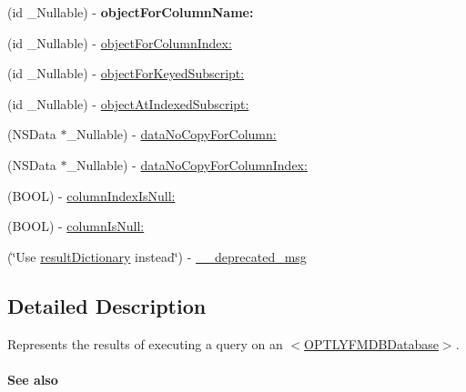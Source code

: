 \begin{DoxyCompactItemize}
\mbox{\label{interface_o_p_t_l_y_f_m_d_b_result_set_a8a54e6edfb9c3a4279a10651121c5daa}} 
(id \+\_\+\+Nullable) -\/ {\bfseries object\+For\+Column\+Name\+:}
\item 
(id \+\_\+\+Nullable) -\/ \mbox{\hyperlink{interface_o_p_t_l_y_f_m_d_b_result_set_a8ab70c23da0b55086576b3cecfdef898}{object\+For\+Column\+Index\+:}}
\item 
(id \+\_\+\+Nullable) -\/ \mbox{\hyperlink{interface_o_p_t_l_y_f_m_d_b_result_set_ae62a2c515a8cfe62a26bc5d340f91f72}{object\+For\+Keyed\+Subscript\+:}}
\item 
(id \+\_\+\+Nullable) -\/ \mbox{\hyperlink{interface_o_p_t_l_y_f_m_d_b_result_set_a497f36dbe6e774a9951b329d4bb7f4b1}{object\+At\+Indexed\+Subscript\+:}}
\item 
(N\+S\+Data $\ast$\+\_\+\+Nullable) -\/ \mbox{\hyperlink{interface_o_p_t_l_y_f_m_d_b_result_set_a4408546aea90f5eaf2044315b286edc6}{data\+No\+Copy\+For\+Column\+:}}
\item 
(N\+S\+Data $\ast$\+\_\+\+Nullable) -\/ \mbox{\hyperlink{interface_o_p_t_l_y_f_m_d_b_result_set_aa044fe54559ae3068230851fb0f7c7b1}{data\+No\+Copy\+For\+Column\+Index\+:}}
\item 
(B\+O\+OL) -\/ \mbox{\hyperlink{interface_o_p_t_l_y_f_m_d_b_result_set_abd2a9b52acb48553a5a57f21a4e23b8d}{column\+Index\+Is\+Null\+:}}
\item 
(B\+O\+OL) -\/ \mbox{\hyperlink{interface_o_p_t_l_y_f_m_d_b_result_set_a110b4b8b0c9fd97fd591c3354139900a}{column\+Is\+Null\+:}}
\item 
(\char`\"{}Use \mbox{\hyperlink{interface_o_p_t_l_y_f_m_d_b_result_set_ace597b275ab7cc2b3f351aec058ac048}{result\+Dictionary}} instead\char`\"{}) -\/ \mbox{\hyperlink{interface_o_p_t_l_y_f_m_d_b_result_set_a758db86030ebe9ba567e2b37d0914352}{\+\_\+\+\_\+deprecated\+\_\+msg}}
\end{DoxyCompactItemize}


\subsection{Detailed Description}
Represents the results of executing a query on an {\ttfamily $<$\mbox{\hyperlink{interface_o_p_t_l_y_f_m_d_b_database}{O\+P\+T\+L\+Y\+F\+M\+D\+B\+Database}}$>$}.

\paragraph*{See also}


